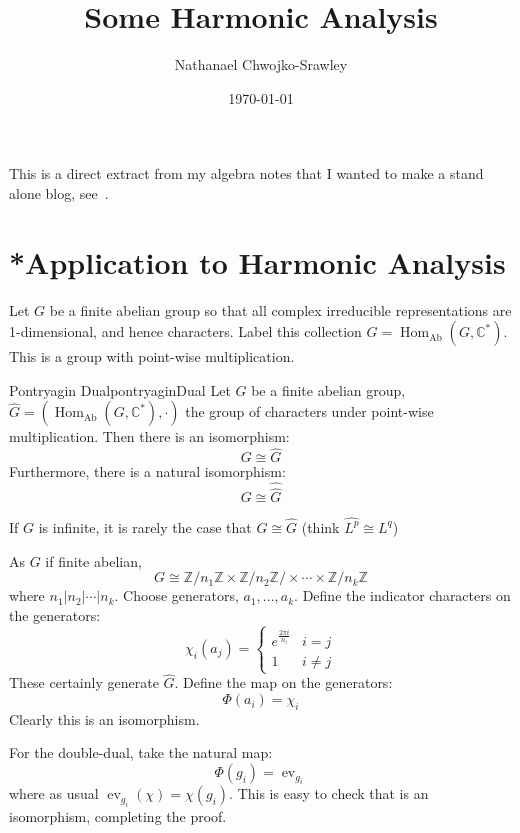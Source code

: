 \documentclass{article}
\title{Some Harmonic Analysis}
\author{Nathanael Chwojko-Srawley}
\date{\today}
\renewcommand{\maketitle}{
    \quad
    \vspace{1em}
  \begin{center}
      \LARGE\bfseries \thetitle \par
      \vspace{0.6em}
      \large
  \end{center}
    \vspace{1em}
}
\newcommand{\C}{{\mathbb{C}}}
\newcommand{\Z}{{\mathbb{Z}}}
\newcommand{\ev}{{\operatorname{ev}}}
\newcommand{\Ab}{{\operatorname{Ab}}}
\newcommand{\Hom}{{\operatorname{Hom}}}
\renewcommand{\mid}{\big|}
\begin{document}
\maketitle

This is a direct extract from my algebra notes that I wanted to make a stand alone blog,
see~\cite{NateAlgebra}.

\section{*Application to Harmonic Analysis}

Let $G$ be a finite abelian group so that all complex irreducible representations are 1-dimensional, and hence
characters. Label
this collection $\hat{G} = \Hom_{\Ab}(G, \C^*)$. This is a group with point-wise multiplication.

\begin{prop}{Pontryagin Dual}{pontryaginDual}
	Let $G$ be a finite abelian group, $\hat{G} = (\Hom_\Ab(G, \C^*), \cdot)$ the group of characters under
	point-wise multiplication. Then there is an isomorphism:
	\[
		G \cong \widehat{G}
	\]
	Furthermore, there is a natural isomorphism:
	\[
		G \cong \hat{\hat{G}}
	\]
\end{prop}

If $G$ is infinite, it is rarely the case that $G \cong \widehat{G}$ (think $\widehat{L^p}\cong L^q$)

\begin{Proof}
	As $G$ if finite abelian,
	\[
		G \cong \Z/n_1\Z\times \Z/n_2\Z/ \times \cdots \times \Z/n_k\Z
	\]
	where $n_1 \mid n_2 \mid \cdots \mid n_k$. Choose generators, $a_1, ..., a_k$. Define the indicator
	characters on the generators:
	\[
		\chi_i(a_j) = \begin{cases}
			e^{\frac{2\pi i}{n_i}} & i = j\\
				1 & i \ne j
		\end{cases}
	\]
	These certainly generate $\hat{G}$. Define the map on the generators:
	\[
		\Phi(a_i) = \chi_i
	\]
	Clearly this is an isomorphism.

	For the double-dual, take the natural map:
	\[
		\Phi(g_i) = \ev_{g_i}
	\]
	where as usual $\ev_{g_i}(\chi) = \chi(g_i)$. This is easy to check that is an isomorphism, completing the
	proof.
\end{Proof}
\end{document}
